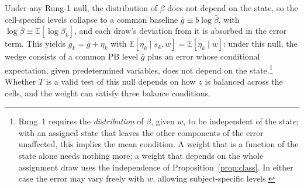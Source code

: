 \documentclass[11pt,a4paper]{article}
\theoremstyle{plain}
\theoremstyle{definition}
\newcommand{\E}{\mathbb{E}}
\begin{document}
Under any Rung-1 null, %
the distribution of $\beta$ does not depend on the state, so the cell-specific levels collapse to a common 
baseline $\bar g\equiv b\log\bar\beta$, with $\log\bar\beta\equiv\E[\log\beta_k]$, and each draw's deviation from it is absorbed in the error term. This yields $g_k=\bar{g}+\eta_k$ with $\mathbb{E}[\eta_k\mid s_k,w]=\mathbb{E}[\eta_k\mid w]$: under this null, the wedge consists of
a common PB level $\bar g$ plus an error whose conditional expectation, given predetermined variables, does not depend on the state.\footnote{Rung~1 requires the \emph{distribution} of $\beta$, given $w$, to be independent of the state; with an assigned state that leaves the other components of the error unaffected, this implies the mean condition. A weight that is a function of the state alone needs nothing more; a weight that depends on the whole assignment draw uses the independence of Proposition~\ref{prop:class}. In either case the error may vary freely with $w$, allowing subject-specific levels.} 
Whether $T$ is a valid test of this null depends on how $z$ is balanced across the %
cells, and the weight can satisfy three balance conditions.

\end{document}
